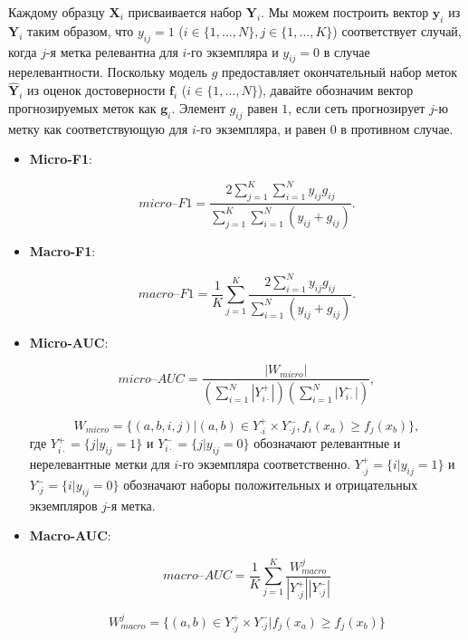 \documentclass[a4paper, 12pt]{article} %
\begin{document}
Каждому образцу $\mathbf{X}_i$ присваивается  набор $\mathbf{Y}_i$. Мы можем построить вектор $\mathbf{y}_{i}$ из $\mathbf{Y}_i$ таким образом, что $y_ {ij} = 1$ ($i \in \{1, \dots, N\}, j \in \{1, \dots, K\}$) соответствует случай, когда $j$-я метка релевантна для $i$-го экземпляра и $y_{ij} = 0$ в случае нерелевантности. Поскольку модель $g$ предоставляет окончательный набор меток $\hat{\mathbf{Y}}_i$ из оценок достоверности $\mathbf{f}_i$ ($i \in \{1, \dots, N\}$), давайте обозначим вектор прогнозируемых меток как $\mathbf{g}_i$. Элемент $g_{ij}$ равен $1$, если сеть прогнозирует $j$-ю метку как соответствующую для $i$-го экземпляра, и равен $0$ в противном случае.

\begin{itemize} 
    \item \textbf{Micro-F1}: 
    
    $$ 
    micro\textrm{--}F1 = \frac{2\sum_{j=1}^{K}\sum_{i=1}^{N}y_{ij}g_{ij}}{\sum_{j=1}^{K}\sum_{i=1}^{N}(y_{ij} + g_{ij})}. 
    $$
    
    \item \textbf{Macro-F1}: 
    
    $$ 
    macro\textrm{--}F1 = \frac{1}{K}\sum_{j=1}^{K} \frac{2\sum_{i=1}^{N}y_{ij}g_{ij}}{\sum_{i=1}^{N}(y_{ij} + g_{ij})}.
    $$
    
    \item \textbf{Micro-AUC}:  
    
    $$
    micro\textrm{--}AUC = \frac{|W_{micro}|}{(\sum_{i=1}^{N}|Y_{i\cdot}^{+}|)(\sum_{i=1}^{N}|Y_{i\cdot}^{-}|)}, 
    $$
    
    $$ W_{micro} = \{(a, b, i, j) | (a, b) \in Y_{\cdot i}^{+} \times Y_{\cdot j}^{-}, f_i(x_a) \geq f_j(x_b)\}, $$ где  $Y_{i\cdot}^{+} = \{j | y_{ij}=1\}$ и $Y_{i\cdot}^{-} = \{j | y_{ij}=0\}$ обозначают релевантные и нерелевантные метки для $i$-го экземпляра соответственно. $Y_{\cdot j}^{+} = \{i | y_{ij}=1\}$ и $Y_{\cdot j}^{-} = \{i | y_{ij}=0\}$ обозначают наборы положительных и отрицательных экземпляров $j$-я метка.
    
    \item \textbf{Macro-AUC}: 
    
    $$
    macro\textrm{--}AUC = \frac{1}{K}\sum_{j=1}^{K}\frac{W_{macro}^{j}}{|Y_{\cdot j}^{+}||Y_{\cdot j}^{-}|}
    $$
    
    $$ W_{macro}^{j} = \{ (a, b) \in Y_{\cdot j}^{+} \times Y_{\cdot j}^{-} | f_{j}(x_a) \geq f_{j}(x_b)\} $$
\end{itemize}
\end{document}
